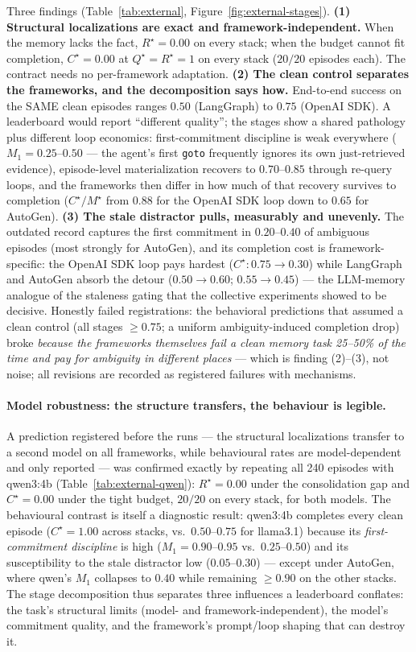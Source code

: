 \documentclass{article}
\newcommand{\method}[1]{\texttt{#1}}
\begin{document}
Three findings (Table~\ref{tab:external},
Figure~\ref{fig:external-stages}). \textbf{(1) Structural
localizations are exact and framework-independent.} When the memory
lacks the fact, $R^\star{=}0.00$ on every stack; when the budget
cannot fit completion, $C^\star{=}0.00$ at $Q^\star{=}R^\star{=}1$ on
every stack ($20/20$ episodes each). The contract needs no
per-framework adaptation. \textbf{(2) The clean control separates the
frameworks, and the decomposition says how.} End-to-end success on the
SAME clean episodes ranges $0.50$ (LangGraph) to $0.75$ (OpenAI SDK).
A leaderboard would report ``different quality''; the stages show a
shared pathology plus different loop economics: first-commitment
discipline is weak everywhere ($M_1{=}0.25$--$0.50$ --- the agent's
first \method{goto} frequently ignores its own just-retrieved
evidence), episode-level materialization recovers to $0.70$--$0.85$
through re-query loops, and the frameworks then differ in how much of
that recovery survives to completion ($C^\star/M^\star$ from $0.88$
for the OpenAI SDK loop down to $0.65$ for AutoGen). \textbf{(3) The
stale distractor pulls, measurably and unevenly.} The outdated record
captures the first commitment in $0.20$--$0.40$ of ambiguous episodes
(most strongly for AutoGen), and its completion cost is
framework-specific: the OpenAI SDK loop pays hardest
($C^\star:0.75\to0.30$) while LangGraph and AutoGen absorb the detour
($0.50\to0.60$; $0.55\to0.45$) --- the LLM-memory analogue of the
staleness gating that the collective experiments showed to be
decisive. Honestly failed registrations: the behavioral predictions
that assumed a clean control (all stages $\ge 0.75$; a uniform
ambiguity-induced completion drop) broke \emph{because the frameworks
themselves fail a clean memory task 25--50\% of the time and pay for
ambiguity in different places} --- which is finding (2)--(3), not
noise; all revisions are recorded as registered failures with
mechanisms.

\paragraph{Model robustness: the structure transfers, the behaviour is
legible.} A prediction registered before the runs --- the structural
localizations transfer to a second model on all frameworks, while
behavioural rates are model-dependent and only reported --- was
confirmed exactly by repeating all 240 episodes with qwen3:4b
(Table~\ref{tab:external-qwen}): $R^\star{=}0.00$ under the
consolidation gap and $C^\star{=}0.00$ under the tight budget, $20/20$
on every stack, for both models. The behavioural contrast is itself a
diagnostic result: qwen3:4b completes every clean episode
($C^\star{=}1.00$ across stacks, vs.\ $0.50$--$0.75$ for llama3.1)
because its \emph{first-commitment discipline} is high
($M_1{=}0.90$--$0.95$ vs.\ $0.25$--$0.50$) and its susceptibility to
the stale distractor low ($0.05$--$0.30$) --- except under AutoGen,
where qwen's $M_1$ collapses to $0.40$ while remaining $\ge 0.90$ on
the other stacks. The stage decomposition thus separates three
influences a leaderboard conflates: the task's structural limits
(model- and framework-independent), the model's commitment quality,
and the framework's prompt/loop shaping that can destroy it.
\end{document}
